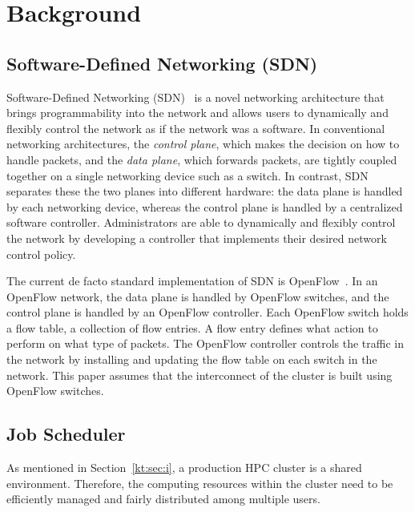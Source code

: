 \documentclass[graybox]{svmult}
\begin{document}
\section{Background}\label{kt:sec:ii}

\subsection{Software-Defined Networking (SDN)}

Software-Defined Networking (SDN)~\cite{Jamalian2015} is a novel networking
architecture that brings programmability into the network and allows users to
dynamically and flexibly control the network as if the network was a software.
In conventional networking architectures, the \textit{control plane}, which
makes the decision on how to handle packets, and the \textit {data plane},
which forwards packets, are tightly coupled together on a single networking
device such as a switch. In contrast, SDN separates these the two planes into
different hardware: the data plane is handled by each networking device,
whereas the control plane is handled by a centralized software controller.
Administrators are able to dynamically and flexibly control the network by
developing a controller that implements their desired network control policy.

The current de facto standard implementation of SDN is
OpenFlow~\cite{McKeown2008}. In an OpenFlow network, the data plane is handled
by OpenFlow switches, and the control plane is handled by an OpenFlow
controller. Each OpenFlow switch holds a flow table, a collection of flow
entries. A flow entry defines what action to perform on what type of packets.
The OpenFlow controller controls the traffic in the network by installing and
updating the flow table on each switch in the network. This paper assumes that
the interconnect of the cluster is built using OpenFlow switches.

\subsection{Job Scheduler}\label{kt:sec:ii-jms}

As mentioned in Section~\ref{kt:sec:i}, a production HPC cluster is a shared
environment. Therefore, the computing resources within the cluster need to be
efficiently managed and fairly distributed among multiple users.
\end{document}
